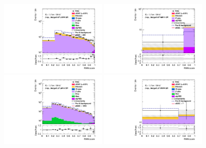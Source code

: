\begin{figure}[]
    \centering
    \includegraphics[width=0.45\textwidth]{figures/aQGC/PostFit/Region_distRNNScoreMerged_DSRVBSHPLMllJ1500_BMin0_J0_incJet1_L2_T0_incFat1_Y6051_incTag1_Fat1_GlobalFit_unconditionnal_mu1log}
    \includegraphics[width=0.45\textwidth]{figures/aQGC/PostFit/Region_distRNNScoreMerged_DSRVBSHPHMllJ1500_BMin0_J0_incJet1_L2_T0_incFat1_Y6051_incTag1_Fat1_GlobalFit_unconditionnal_mu1log}
    \includegraphics[width=0.45\textwidth]{figures/aQGC/PostFit/Region_distRNNScoreMerged_DSRVBSLPLMllJ1500_BMin0_J0_incJet1_L2_T0_incFat1_Y6051_incTag1_Fat1_GlobalFit_unconditionnal_mu1log}
    \includegraphics[width=0.45\textwidth]{figures/aQGC/PostFit/Region_distRNNScoreMerged_DSRVBSLPHMllJ1500_BMin0_J0_incJet1_L2_T0_incFat1_Y6051_incTag1_Fat1_GlobalFit_unconditionnal_mu1log}

\end{figure}
